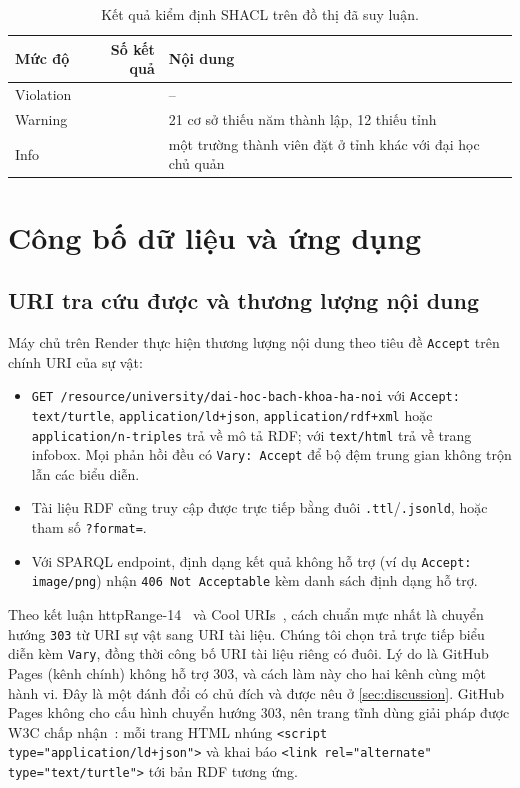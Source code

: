 \documentclass[12pt,a4paper]{article}
\begin{document}
\begin{table}[htbp]
\centering\small
\caption{Kết quả kiểm định SHACL trên đồ thị đã suy luận.}\label{tab:shacl}
\begin{tabular}{lrl}
\toprule
Mức độ & Số kết quả & Nội dung \\
\midrule
Violation & \metricViolations{} & -- \\
Warning   & \metricWarnings{} & 21 cơ sở thiếu năm thành lập, 12 thiếu tỉnh \\
Info      & \metricInformationResults{} & một trường thành viên đặt ở tỉnh khác với đại học chủ quản \\
\bottomrule
\end{tabular}
\end{table}

\section{Công bố dữ liệu và ứng dụng}\label{sec:publish}

\subsection{URI tra cứu được và thương lượng nội dung}
Máy chủ trên Render thực hiện thương lượng nội dung theo tiêu đề \texttt{Accept} trên chính URI của sự vật:
\begin{itemize}
  \item \texttt{GET /resource/university/dai-hoc-bach-khoa-ha-noi} với \texttt{Accept: text/turtle},
  \texttt{application/ld+json}, \texttt{application/rdf+xml} hoặc \texttt{application/n-triples} trả về mô tả RDF; với
  \texttt{text/html} trả về trang infobox. Mọi phản hồi đều có \texttt{Vary: Accept} để bộ đệm trung gian không trộn
  lẫn các biểu diễn.
  \item Tài liệu RDF cũng truy cập được trực tiếp bằng đuôi \texttt{.ttl}/\texttt{.jsonld}, hoặc tham số
  \texttt{?format=}.
  \item Với SPARQL endpoint, định dạng kết quả không hỗ trợ (ví dụ \texttt{Accept: image/png}) nhận
  \texttt{406 Not Acceptable} kèm danh sách định dạng hỗ trợ.
\end{itemize}
Theo kết luận httpRange-14~\cite{w3c2005httprange14} và Cool URIs~\cite{w3c2008cooluris}, cách chuẩn mực nhất là
chuyển hướng \texttt{303} từ URI sự vật sang URI tài liệu. Chúng tôi chọn trả trực tiếp biểu diễn kèm \texttt{Vary}, đồng
thời công bố URI tài liệu riêng có đuôi. Lý do là GitHub Pages (kênh chính) không hỗ trợ 303, và cách làm này cho hai kênh
cùng một hành vi. Đây là một đánh đổi có chủ đích và được nêu ở \cref{sec:discussion}.
GitHub Pages không cho cấu hình chuyển hướng 303, nên trang tĩnh dùng giải pháp được W3C chấp
nhận~\cite{w3c2014bp}: mỗi trang HTML nhúng \texttt{<script type="application/ld+json">} và khai báo
\texttt{<link rel="alternate" type="text/turtle">} tới bản RDF tương ứng.
\end{document}
